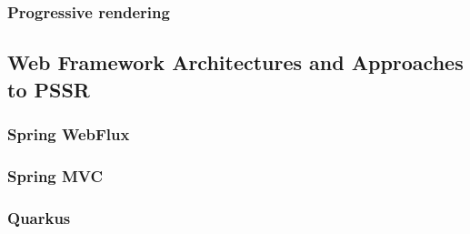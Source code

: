 \subsubsection{Progressive rendering}


\subsection{Web Framework Architectures and Approaches to PSSR}

\subsubsection{Spring WebFlux}

\subsubsection{Spring MVC}

\subsubsection{Quarkus}